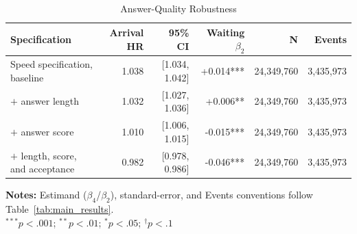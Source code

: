\begin{table}[H]
\caption{Answer-Quality Robustness}
\label{tab:answer_quality_robustness}
\centering
\footnotesize
\begin{tabular}{@{}lrrrrr@{}}
\toprule
\textbf{Specification} & \textbf{Arrival HR} & \textbf{95\% CI} & \textbf{Waiting $\beta_2$} & \textbf{N} & \textbf{Events} \\
\midrule
Speed specification, baseline & 1.038 & [1.034, 1.042] & +0.014*** & 24,349,760 & 3,435,973 \\
$+$ answer length & 1.032 & [1.027, 1.036] & +0.006** & 24,349,760 & 3,435,973 \\
$+$ answer score & 1.010 & [1.006, 1.015] & -0.015*** & 24,349,760 & 3,435,973 \\
$+$ length, score, and acceptance & 0.982 & [0.978, 0.986] & -0.046*** & 24,349,760 & 3,435,973 \\
\bottomrule
\end{tabular}
\vspace{0.35em}
\begin{minipage}{\linewidth}
\footnotesize
\raggedright
\textbf{Notes:} Estimand ($\beta_4$/$\beta_2$), standard-error, and Events conventions follow Table~\ref{tab:main_results}.\\
$^{***}p<.001$; $^{**}p<.01$; $^{*}p<.05$; $^{\dagger}p<.1$
\end{minipage}
\end{table}